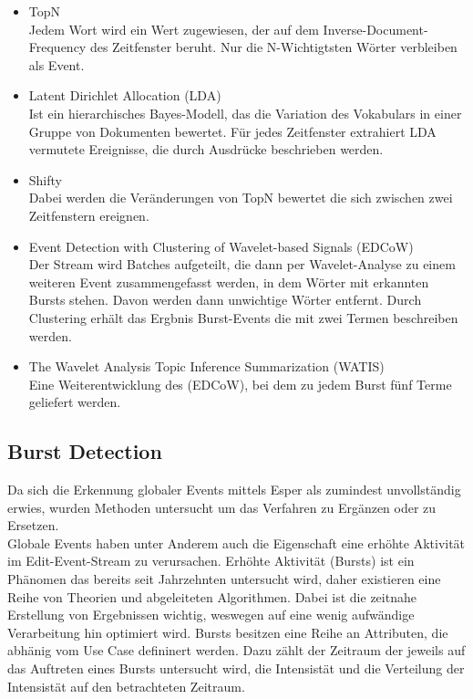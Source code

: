 \begin{itemize}
\item TopN\\Jedem Wort wird ein Wert zugewiesen, der auf dem Inverse-Document-Frequency des Zeitfenster beruht. Nur die N-Wichtigtsten Wörter verbleiben als Event.
\item Latent Dirichlet Allocation (LDA)\\Ist ein hierarchisches Bayes-Modell, das die Variation des Vokabulars in einer Gruppe von Dokumenten bewertet. Für jedes Zeitfenster extrahiert LDA  vermutete Ereignisse, die durch Ausdrücke beschrieben werden. 
\item Shifty\\Dabei werden die Veränderungen von TopN bewertet die sich zwischen zwei Zeitfenstern ereignen.
\item Event Detection with Clustering of
Wavelet-based Signals (EDCoW)\\Der Stream wird Batches aufgeteilt, die dann per Wavelet-Analyse zu einem weiteren Event zusammengefasst werden, in dem Wörter mit erkannten Bursts stehen. Davon werden dann unwichtige Wörter entfernt. Durch Clustering erhält das Ergbnis Burst-Events die mit zwei Termen beschreiben werden.
\item The Wavelet Analysis Topic Inference Summarization
(WATIS)\\ Eine Weiterentwicklung des (EDCoW), bei dem zu jedem Burst fünf Terme geliefert werden.
\end{itemize}

\subsection{Burst Detection}
Da sich die Erkennung globaler Events mittels Esper als zumindest unvollständig erwies, wurden Methoden untersucht um das Verfahren zu Ergänzen oder zu Ersetzen.\\

Globale Events haben unter Anderem auch die Eigenschaft eine erhöhte Aktivität im Edit-Event-Stream zu verursachen. Erhöhte Aktivität (Bursts) ist ein Phänomen das bereits seit Jahrzehnten untersucht wird, daher existieren eine Reihe von Theorien und abgeleiteten Algorithmen. Dabei ist die zeitnahe Erstellung von Ergebnissen wichtig, weswegen auf eine wenig aufwändige Verarbeitung hin optimiert wird. Bursts besitzen eine Reihe an Attributen, die abhänig vom Use Case defininert werden. Dazu zählt der Zeitraum der jeweils auf das Auftreten eines Bursts untersucht wird, die Intensistät und die Verteilung der Intensistät auf den betrachteten Zeitraum.\\


